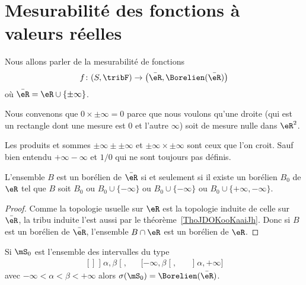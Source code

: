 \section{Mesurabilité des fonctions à valeurs réelles}

Nous allons parler de la mesurabilité de fonctions
\begin{equation}
    f\colon (S,\tribF)\to \big( \bar \eR,\Borelien(\bar \eR) \big)
\end{equation}
où \( \bar \eR=\eR\cup\{ \pm\infty \}\).

\begin{normaltext}      \label{normooGAAJooUPCbzG}
Nous convenons que \( 0\times\pm\infty=0\) parce que nous voulons qu'une droite (qui est un rectangle dont une mesure est \( 0\) et l'autre \( \infty\)) soit de mesure nulle dans \( \eR^2\).

Les produits et sommes \( \pm\infty\pm\pm\infty\) et \( \pm\infty\times \pm\infty\) sont ceux que l'on croit. Sauf bien entendu \( +\infty-\infty\) et \( 1/0\) qui ne sont toujours pas définis.
\end{normaltext}

\begin{lemma}       \label{LEMooBLOLooAdNViv}
    L'ensemble \( B\) est un borélien de \( \bar \eR\) si et seulement si il existe un borélien \( B_0\) de \( \eR\) tel que \( B\) soit \( B_0\) ou \( B_0\cup\{ -\infty \}\) ou \( B_0\cup\{ -\infty \}\) ou \( B_0\cup\{ +\infty,-\infty \}\).
\end{lemma}

\begin{proof}
    Comme la topologie usuelle sur \( \eR\) est la topologie induite de celle sur \( \bar \eR\), la tribu induite l'est aussi par le théorème~\ref{ThoJDOKooKaaiJh}. Donc si \( B\) est un borélien de \( \bar \eR\), l'ensemble \( B\cap \eR\) est un borélien de \( \eR\).
\end{proof}

\begin{lemma}       \label{LemooCRVJooQosHPq}
    Si \( \mS_0\) est l'ensemble des intervalles du type
    \begin{equation}
        \begin{aligned}[]
            \mathopen] \alpha , \beta \mathclose[, && \mathopen[ -\infty , \beta \mathclose[, && \mathopen] \alpha , +\infty \mathclose]
        \end{aligned}
    \end{equation}
    avec \( -\infty<\alpha<\beta<+\infty\) alors \( \sigma(\mS_0)=\Borelien(\bar\eR)\).
\end{lemma}

